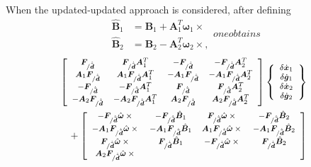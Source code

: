 \documentclass[10pt,dvips,fleqn,subeqn]{report}
\newcommand{\T}[1]{\bm{#1}}
\newcommand{\TT}[1]{\bm{#1}}
\begin{document}
When the updated-updated approach is considered,
after defining
\begin{subequations}
\begin{align}
	\hat{\TT{B}}_1 &= \TT{B}_1 + \TT{A}_1^T \T{\omega}_1\times{}
	\\
	\hat{\TT{B}}_2 &= \TT{B}_2 - \TT{A}_2^T \T{\omega}_2\times{}
	,
\end{align}
one obtains
\end{subequations}
\begin{align}
	\footnotesize
	\sqbr{\matr{cccc}{
		\T{F}_{/\dot{\tilde{\T{d}}}} 
		& \T{F}_{/\dot{\tilde{\T{d}}}} \TT{A}_1^T
		& - \T{F}_{/\dot{\tilde{\T{d}}}}
		& - \T{F}_{/\dot{\tilde{\T{d}}}} \TT{A}_2^T \\
%
		\TT{A}_1 \T{F}_{/\dot{\tilde{\T{d}}}} 
		& \TT{A}_1 \T{F}_{/\dot{\tilde{\T{d}}}} \TT{A}_1^T
		& - \TT{A}_1 \T{F}_{/\dot{\tilde{\T{d}}}}
		& - \TT{A}_1 \T{F}_{/\dot{\tilde{\T{d}}}} \TT{A}_2^T \\
%
		- \T{F}_{/\dot{\tilde{\T{d}}}} 
		& - \T{F}_{/\dot{\tilde{\T{d}}}} \TT{A}_1^T
		& \T{F}_{/\dot{\tilde{\T{d}}}}
		& \T{F}_{/\dot{\tilde{\T{d}}}} \TT{A}_2^T \\
%
		- \TT{A}_2 \T{F}_{/\dot{\tilde{\T{d}}}} 
		& - \TT{A}_2 \T{F}_{/\dot{\tilde{\T{d}}}} \TT{A}_1^T
		& \TT{A}_2 \T{F}_{/\dot{\tilde{\T{d}}}}
		& \TT{A}_2 \T{F}_{/\dot{\tilde{\T{d}}}} \TT{A}_2^T
	}} \cubr{\cvvect{
		\delta\dot{\T{x}}_1 \\
		\delta\dot{\T{g}}_1 \\
		\delta\dot{\T{x}}_2 \\
		\delta\dot{\T{g}}_2
	}} & \nonumber \\
	\footnotesize
	\mbox{} + \sqbr{\matr{cccc}{
		- \T{F}_{/\dot{\tilde{\T{d}}}} \hat{\T{\omega}}\times{}
		& - \T{F}_{/\dot{\tilde{\T{d}}}} \hat{\TT{B}}_1
		& \T{F}_{/\dot{\tilde{\T{d}}}} \hat{\T{\omega}}\times{}
		& - \T{F}_{/\dot{\tilde{\T{d}}}} \hat{\TT{B}}_2 \\
%
		- \TT{A}_1 \T{F}_{/\dot{\tilde{\T{d}}}} \hat{\T{\omega}}\times{}
		& - \TT{A}_1 \T{F}_{/\dot{\tilde{\T{d}}}} \hat{\TT{B}}_1
		& \TT{A}_1 \T{F}_{/\dot{\tilde{\T{d}}}} \hat{\T{\omega}}\times{}
		& - \TT{A}_1 \T{F}_{/\dot{\tilde{\T{d}}}} \hat{\TT{B}}_2 \\
%
		\T{F}_{/\dot{\tilde{\T{d}}}} \hat{\T{\omega}}\times{}
		& \T{F}_{/\dot{\tilde{\T{d}}}} \hat{\TT{B}}_1
		& - \T{F}_{/\dot{\tilde{\T{d}}}} \hat{\T{\omega}}\times{}
		& \T{F}_{/\dot{\tilde{\T{d}}}} \hat{\TT{B}}_2 \\
%
		\TT{A}_2 \T{F}_{/\dot{\tilde{\T{d}}}} \hat{\T{\omega}}\times{}
}}
\end{align}
\end{document}
